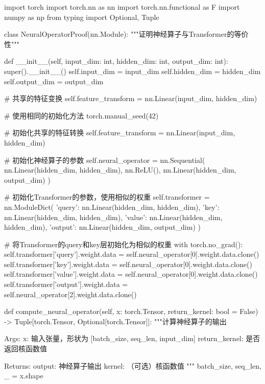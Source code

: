 \documentclass{MMCStyle}
\begin{document}
 \begin{python}
  import torch
import torch.nn as nn
import torch.nn.functional as F
import numpy as np
from typing import Optional, Tuple

class NeuralOperatorProof(nn.Module):
    """证明神经算子与Transformer的等价性"""
    
    def __init__(self, input_dim: int, hidden_dim: int, output_dim: int):
        super().__init__()
        self.input_dim = input_dim
        self.hidden_dim = hidden_dim
        self.output_dim = output_dim
        
        # 共享的特征变换
        self.feature_transform = nn.Linear(input_dim, hidden_dim)
        
        # 使用相同的初始化方法
        torch.manual_seed(42)
        
        # 初始化共享的特征转换
        self.feature_transform = nn.Linear(input_dim, hidden_dim)
        
        # 初始化神经算子的参数
        self.neural_operator = nn.Sequential(
            nn.Linear(hidden_dim, hidden_dim),
            nn.ReLU(),
            nn.Linear(hidden_dim, output_dim)
        )
        
        # 初始化Transformer的参数，使用相似的权重
        self.transformer = nn.ModuleDict({
            'query': nn.Linear(hidden_dim, hidden_dim),
            'key': nn.Linear(hidden_dim, hidden_dim),
            'value': nn.Linear(hidden_dim, hidden_dim),
            'output': nn.Linear(hidden_dim, output_dim)
        })
        
        # 将Transformer的query和key层初始化为相似的权重
        with torch.no_grad():
            self.transformer['query'].weight.data = self.neural_operator[0].weight.data.clone()
            self.transformer['key'].weight.data = self.neural_operator[0].weight.data.clone()
            self.transformer['value'].weight.data = self.neural_operator[0].weight.data.clone()
            self.transformer['output'].weight.data = self.neural_operator[2].weight.data.clone()
        
    def compute_neural_operator(self, x: torch.Tensor, 
                              return_kernel: bool = False) -> Tuple[torch.Tensor, Optional[torch.Tensor]]:
        """计算神经算子的输出
        
        Args:
            x: 输入张量，形状为 [batch_size, seq_len, input_dim]
            return_kernel: 是否返回核函数值
            
        Returns:
            output: 神经算子输出
            kernel: （可选）核函数值
        """
        batch_size, seq_len, _ = x.shape
        

\end{python}
\end{document}
